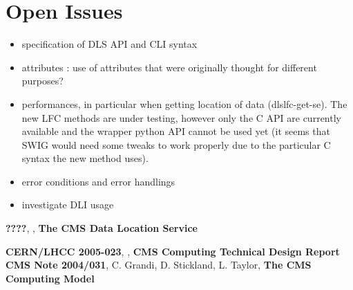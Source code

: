 \documentclass[pdftex]{cmspaper}
\begin{document}
\section{Open Issues}
\begin{itemize}
 \item specification of DLS API and CLI syntax
 \item attributes : use of attributes that were originally thought for different purposes?
 \item performances, in particular when getting location of data (dlslfc-get-se). The new LFC methods are under testing, however only the C API are currently available and the wrapper python API cannot be used yet (it seems that SWIG would need some tweaks to work properly due to the particular C syntax the new method uses).
 
 \item error conditions and error handlings
 \item investigate DLI usage
\end{itemize}  

\begin{thebibliography}{9}
   {\bf ????}, , {\bf The CMS Data Location Service} 
  
   {\bf CERN/LHCC 2005-023}, , {\bf CMS Computing Technical Design Report}
   {\bf CMS Note 2004/031}, C. Grandi, D. Stickland,
               L. Taylor, {\bf The CMS Computing Model}

\end{thebibliography}
 
\pagebreak
\end{document}
